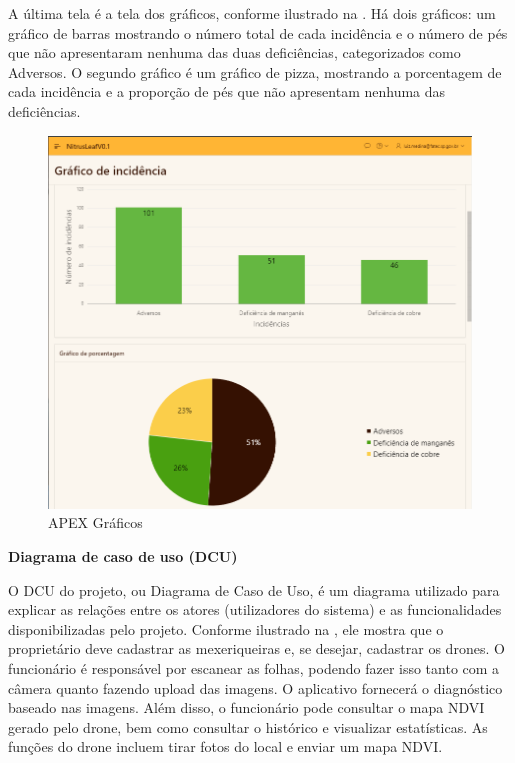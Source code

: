 \documentclass[
  a4paper,%
  12pt,%
  english,%
  brazilian,%
]{article}
\begin{document}
A última tela é a tela dos gráficos, conforme ilustrado na . Há dois gráficos: um gráfico de barras mostrando o número total de cada incidência e o número de pés que não apresentaram nenhuma das duas deficiências, categorizados como Adversos. O segundo gráfico é um gráfico de pizza, mostrando a porcentagem de cada incidência e a proporção de pés que não apresentam nenhuma das deficiências.

\begin{figure}[H]
\centering
\caption{APEX Gráficos}%
\label{fig:grafico}
\includegraphics[width=0.8\linewidth]{Logos/grafico.png}
\end{figure}

\textbf{Diagrama de caso de uso (DCU)}

O DCU do projeto, ou Diagrama de Caso de Uso, é um diagrama utilizado para explicar as relações entre os atores (utilizadores do sistema) e as funcionalidades disponibilizadas pelo projeto. Conforme ilustrado na , ele mostra que o proprietário deve cadastrar as mexeriqueiras e, se desejar, cadastrar os drones. O funcionário é responsável por escanear as folhas, podendo fazer isso tanto com a câmera quanto fazendo upload das imagens. O aplicativo fornecerá o diagnóstico baseado nas imagens. Além disso, o funcionário pode consultar o mapa NDVI gerado pelo drone, bem como consultar o histórico e visualizar estatísticas. As funções do drone incluem tirar fotos do local e enviar um mapa NDVI.
\end{document}

